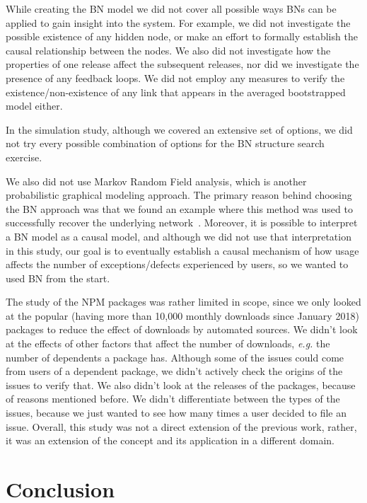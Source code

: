 \documentclass[smallcondensed]{svjour3}     %
\begin{document}
While creating the BN model we did not cover all possible ways BNs can be applied to gain insight into the system. For example, we did not investigate the possible existence of any hidden node, or make an effort to formally establish the causal relationship between the nodes. We also did not investigate how the properties of one release affect the subsequent releases, nor did we investigate the presence of any feedback loops. We did not employ any measures to verify the existence/non-existence of any link that appears in the averaged bootstrapped model either.

In the simulation study, although we covered an extensive set of options, we did not try every possible combination of options for the BN structure search exercise.

We also did not use Markov Random Field analysis, which is another probabilistic graphical modeling approach. The primary reason behind choosing the BN approach was that we found an example where this method was used to successfully recover the underlying network~\cite{bnppt}. 
Moreover, it is possible to interpret a BN model as a causal model, and although we did not use that interpretation in this study, our goal is to eventually establish a causal mechanism of how usage affects the number of exceptions/defects experienced by users, so we wanted to used BN from the start.



The study of the NPM packages was rather limited in scope, since we
only looked at the popular (having more than 10,000 monthly downloads 
since January 2018) packages to reduce the effect of downloads by 
automated sources. We didn't look at the effects of other factors 
that affect the number of downloads, \emph{e.g.} the number of 
dependents a package has. Although some of the issues could come 
from users of a dependent package, we didn't actively check the
origins of the issues to verify that. We also didn't look at the
releases of the packages, because of reasons mentioned before.
We didn't differentiate between the types of the issues, because we 
just wanted to see how many times a user decided to file an issue.
Overall, this study was not a direct extension of the previous work,
rather, it was an extension of the concept and its application in a different domain.


\vspace{-10pt}
\section{Conclusion}\label{s:conclusion}
\end{document}
